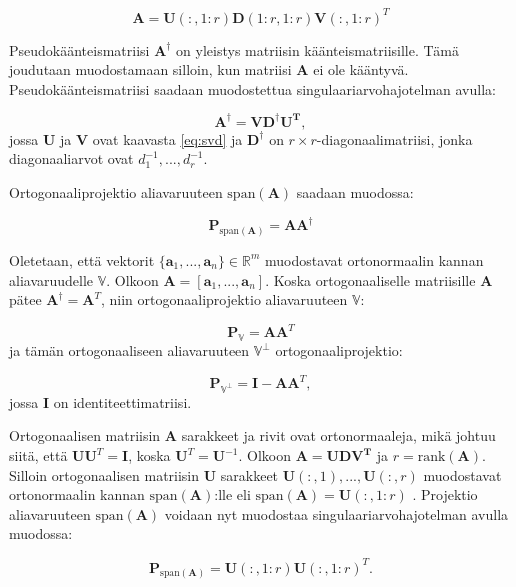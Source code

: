 \begin{equation}
    \mathbf{A} = \mathbf{U}(:,1:r)\mathbf{D}(1:r,1:r)\mathbf{V}(:,1:r)^T
    \label{eq:2}
\end{equation}


Pseudokäänteismatriisi $\mathbf{A^{\dagger}}$ on yleistys matriisin käänteismatriisille. Tämä joudutaan muodostamaan silloin, kun matriisi $\mathbf{A}$ ei ole kääntyvä. Pseudokäänteismatriisi saadaan muodostettua singulaariarvohajotelman avulla:

\begin{equation}
    \mathbf{A^{\dagger} = VD^{\dagger}U^T},
\end{equation}
jossa \textbf{U} ja \textbf{V} ovat kaavasta \ref{eq:svd} ja $\mathbf{D}^{\dagger}$ on $r\times r$-diagonaalimatriisi, jonka diagonaaliarvot ovat $d^{-1}_1,...,d^{-1}_r$.

Ortogonaaliprojektio aliavaruuteen $\text{span}(\mathbf{A})$ saadaan muodossa: 

\begin{equation}
    \mathbf{P}_{\text{span}(\mathbf{A})}= \mathbf{AA}^{\dagger}
\end{equation}

Oletetaan, että vektorit $\{\mathbf{a}_1,...,\mathbf{a}_n\} \in \mathbb{R}^m$ muodostavat ortonormaalin kannan aliavaruudelle $\mathbb{V}$. Olkoon $\mathbf{A} = [\mathbf{a}_1,...,\mathbf{a}_n]$. Koska ortogonaaliselle matriisille \textbf{A} pätee $\mathbf{A}^{\dagger} = \mathbf{A}^T$, niin ortogonaaliprojektio aliavaruuteen $\mathbb{V}$:

\begin{equation}
    \mathbf{P}_{\mathbb{V}} = \mathbf{AA}^T
\end{equation}
ja tämän ortogonaaliseen aliavaruuteen $\mathbb{V}^{\bot}$ ortogonaaliprojektio:

\begin{equation}
    \mathbf{P}_{\mathbb{V}^{\bot}}=\mathbf{I}-\mathbf{AA}^T,
\end{equation}
jossa \textbf{I} on identiteettimatriisi.

Ortogonaalisen matriisin \textbf{A} sarakkeet ja rivit ovat ortonormaaleja, mikä johtuu siitä, että $\mathbf{U}\mathbf{U}^T = \mathbf{I}$, koska $\mathbf{U}^T = \mathbf{U}^{-1}$. Olkoon $\mathbf{A = UDV^T}$ ja $r = \text{rank}(\mathbf{A})$. Silloin ortogonaalisen matriisin \textbf{U} sarakkeet $\mathbf{U}(:,1),...,\mathbf{U}(:,r)$ muodostavat ortonormaalin kannan $\text{span}(\mathbf{A})$:lle eli $\text{span}(\mathbf{A}) = \mathbf{U}(:,1:r)$ \citep{Uusitalo1997Signal-spaceComponents}. Projektio aliavaruuteen $\text{span}(\mathbf{A})$ voidaan nyt muodostaa singulaariarvohajotelman avulla muodossa:

\begin{equation}
    \mathbf{P}_{\text{span}(\mathbf{A})} = \mathbf{U}(:,1:r)\mathbf{U}(:,1:r)^T.
    \label{eq:projektio}
\end{equation}
